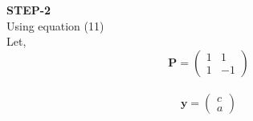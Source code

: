 \documentclass[10pt,a4paper]{report}
\begin{document}
\begin{multicols}{2}
\textbf{STEP-2}\vspace{2mm}\\
Using equation (11) \vspace{2mm}\\
 Let,
\begin{equation}
\boldsymbol{P} =\begin{pmatrix}
1 & 1\\
1 &-1
\end{pmatrix} 
\end{equation} \\ \vspace{2mm}
\begin{equation}
  \boldsymbol{y} =\begin{pmatrix}
c \\
a
\end{pmatrix} 
\end{equation}  \vspace{2mm}


\end{multicols}
\end{document}
